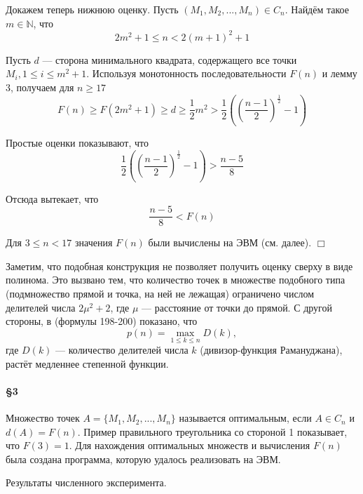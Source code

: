 \documentclass[a4paper,14pt]{article} %
\begin{document}
Докажем теперь нижнюю оценку.
Пусть $\left(M_1, M_2, ..., M_n\right) \in C_n$.
Найдём такое $m\in \mathbb{N}$, что
$$
2m^2+1 \leq n < 2(m+1)^2 +1
$$

Пусть $d$ --- сторона минимального квадрата, содержащего все точки $M_i, 1\leq i \leq m^2+1$.
Используя монотонность последовательности $F(n)$ и лемму 3, получаем для $n\geq 17$
$$
F(n) \geq F\left(2m^2+1\right)\geq d \geq \frac{1}{2}m^2 > \frac{1}{2}\left(\left(\frac{n-1}{2}\right)^\frac{1}{2} - 1 \right)
$$

Простые оценки показывают, что
$$
\frac{1}{2}\left(\left(\frac{n-1}{2}\right)^\frac{1}{2} -1 \right) > \frac{n-5}{8}
$$

Отсюда вытекает, что
$$
\frac{n-5}{8}<F(n)
$$

Для $3 \leq n < 17$ значения $F(n)$ были вычислены на ЭВМ (см. далее).
$\Box$


Заметим, что подобная конструкция не позволяет получить оценку сверху в виде полинома.
Это вызвано тем, что количество точек в множестве подобного типа (подмножество прямой и точка, на ней не лежащая) ограничено числом  делителей числа $2\mu^2+2$, где $\mu$ --- расстояние от точки до прямой.
С другой стороны, в \cite{Ramanujan} (формулы 198-200) показано, что
$$
p(n)=\max\limits_{1\leq k \leq n} D(k),
$$
где $D(k)$ --- количество делителей числа $k$ (дивизор-функция Рамануджана),
растёт медленнее степенной функции.



\paragraph{\S 3} Множество точек $A=\{M_1, M_2, ..., M_n\}$ называется оптимальным, если $A \in C_n$ и $d(A) = F(n)$.
Пример правильного треугольника со стороной 1 показывает, что $F(3)=1$.
Для нахождения оптимальных множеств и вычисления $F(n)$ была создана программа, которую удалось реализовать на ЭВМ.


Результаты численного эксперимента.
\end{document}
